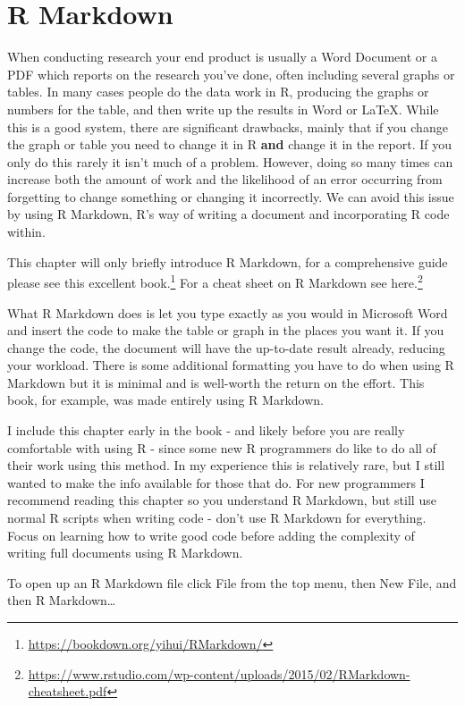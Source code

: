 \documentclass[
  a4paper,
]{krantz}
\renewcommand{\href}[2]{#2\footnote{\url{#1}}}
\begin{document}
\hypertarget{r-markdown}{%
\chapter{R Markdown}\label{r-markdown}}

When conducting research your end product is usually a Word
Document or a PDF which reports on the research you've done,
often including several graphs or tables. In many cases
people do the data work in R, producing the graphs or
numbers for the table, and then write up the results in Word
or LaTeX. While this is a good system, there are significant
drawbacks, mainly that if you change the graph or table you
need to change it in R \textbf{and} change it in the report.
If you only do this rarely it isn't much of a problem.
However, doing so many times can increase both the amount of
work and the likelihood of an error occurring from
forgetting to change something or changing it incorrectly.
We can avoid this issue by using R Markdown, R's way of
writing a document and incorporating R code within.

This chapter will only briefly introduce R Markdown, for a
comprehensive guide please see
\href{https://bookdown.org/yihui/RMarkdown/}{this excellent
book.} For a cheat sheet on R Markdown see
\href{https://www.rstudio.com/wp-content/uploads/2015/02/RMarkdown-cheatsheet.pdf}{here.}

What R Markdown does is let you type exactly as you would in
Microsoft Word and insert the code to make the table or
graph in the places you want it. If you change the code, the
document will have the up-to-date result already, reducing
your workload. There is some additional formatting you have
to do when using R Markdown but it is minimal and is
well-worth the return on the effort. This book, for example,
was made entirely using R Markdown.

I include this chapter early in the book - and likely before
you are really comfortable with using R - since some new R
programmers do like to do all of their work using this
method. In my experience this is relatively rare, but I
still wanted to make the info available for those that do.
For new programmers I recommend reading this chapter so you
understand R Markdown, but still use normal R scripts when
writing code - don't use R Markdown for everything. Focus on
learning how to write good code before adding the complexity
of writing full documents using R Markdown.

To open up an R Markdown file click File from the top menu,
then New File, and then R Markdown\ldots{}
\end{document}
